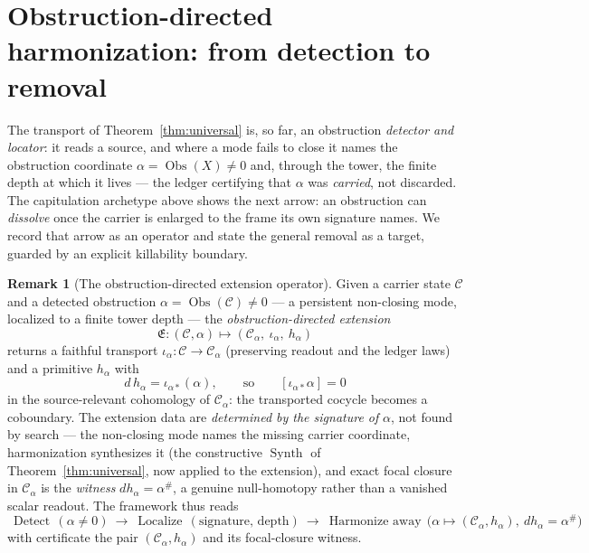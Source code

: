 \documentclass[11pt]{article}
\theoremstyle{definition}
\newtheorem{remark}[theorem]{Remark}
\begin{document}
\section{Obstruction-directed harmonization: from detection to removal}\label{sec:obs-removal}

The transport of Theorem~\ref{thm:universal} is, so far, an obstruction \emph{detector and locator}: it reads a
source, and where a mode fails to close it names the obstruction coordinate $\alpha=\operatorname{Obs}(X)\neq0$
and, through the tower, the finite depth at which it lives --- the ledger certifying that $\alpha$ was
\emph{carried}, not discarded. The capitulation archetype above shows the next arrow: an obstruction can
\emph{dissolve} once the carrier is enlarged to the frame its own signature names. We record that arrow as an
operator and state the general removal as a target, guarded by an explicit killability boundary.

\begin{remark}[The obstruction-directed extension operator]\label{def:obs-ext}
Given a carrier state $\mathcal C$ and a detected obstruction $\alpha=\operatorname{Obs}(\mathcal C)\neq0$ --- a
persistent non-closing mode, localized to a finite tower depth --- the \emph{obstruction-directed extension}
\[
  \mathfrak E:(\mathcal C,\alpha)\longmapsto(\mathcal C_\alpha,\ \iota_\alpha,\ h_\alpha)
\]
returns a faithful transport $\iota_\alpha:\mathcal C\to\mathcal C_\alpha$ (preserving readout and the ledger
laws) and a primitive $h_\alpha$ with
\[
  d\,h_\alpha=\iota_{\alpha*}(\alpha),\qquad\text{so}\qquad [\iota_{\alpha*}\alpha]=0
\]
in the source-relevant cohomology of $\mathcal C_\alpha$: the transported cocycle becomes a coboundary. The
extension data are \emph{determined by the signature of} $\alpha$, not found by search --- the non-closing mode
names the missing carrier coordinate, harmonization synthesizes it (the constructive $\operatorname{Synth}$ of
Theorem~\ref{thm:universal}, now applied to the extension), and exact focal closure in $\mathcal C_\alpha$ is the
\emph{witness} $d h_\alpha=\alpha^\#$, a genuine null-homotopy rather than a vanished scalar readout. The
framework thus reads
\[
  \boxed{\ \operatorname{Detect}\,(\alpha\neq0)\ \rightarrow\ \operatorname{Localize}\,(\text{signature, depth})\ \rightarrow\ \operatorname{Harmonize\ away}\,\big(\alpha\mapsto(\mathcal C_\alpha,h_\alpha),\ dh_\alpha=\alpha^\#\big)\ }
\]
with certificate the pair $(\mathcal C_\alpha,h_\alpha)$ and its focal-closure witness.
\end{remark}
\end{document}
